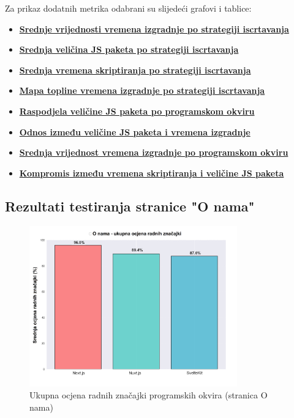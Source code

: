 \bigskip
\noindent
Za prikaz dodatnih metrika odabrani su slijedeći grafovi i tablice:

\begin{itemize}
    \item \hyperref[fig:average_build_times_by_framework_and_strategy]{\textbf{Srednje vrijednosti vremena izgradnje po strategiji iscrtavanja}}
    \item \hyperref[fig:average_bundle_size_by_strategy]{\textbf{Srednja veličina JS paketa po strategiji iscrtavanja}}
    \item \hyperref[fig:average_scripting_performance_times]{\textbf{Srednja vremena skriptiranja po strategiji iscrtavanja}}
    \item \hyperref[fig:build_times_heat_map]{\textbf{Mapa topline vremena izgradnje po strategiji iscrtavanja}}
    \item \hyperref[fig:bundle_size_distribution_by_framework]{\textbf{Raspodjela veličine JS paketa po programskom okviru}}
    \item \hyperref[fig:bundle_size_vs_build_time_correlation]{\textbf{Odnos između veličine JS paketa i vremena izgradnje}}
    \item \hyperref[fig:overall_framework_build_performance]{\textbf{Srednja vrijednost vremena izgradnje po programskom okviru}}
    \item \hyperref[fig:performance_vs_bundle_size_tradeoff]{\textbf{Kompromis između vremena skriptiranja i veličine JS paketa}}
\end{itemize}

\subsection{Rezultati testiranja stranice "O nama"}
\label{sec:rezultati-o-nama}

\begin{figure}[H]
    \centering
    \includegraphics[width=0.8\textwidth]{slike/rezultati/about/about_framework_overall_performance.png}
    \caption{Ukupna ocjena radnih značajki programskih okvira (stranica O nama)}
    \label{fig:testiranje-o-nama-ukupne-performanse}
\end{figure}

